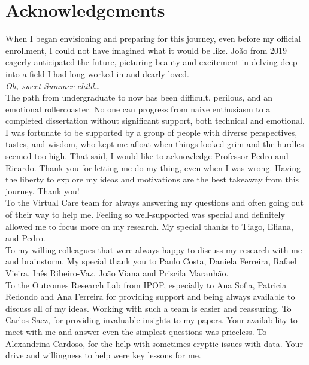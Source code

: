 \chapter*{Acknowledgements}

When I began envisioning and preparing for this journey, even before my official enrollment, I could not have imagined what it would be like. João from 2019 eagerly anticipated the future, picturing beauty and excitement in delving deep into a field I had long worked in and dearly loved. \\
 \textit{Oh, sweet Summer child…} \\

The path from undergraduate to now has been difficult, perilous, and an emotional rollercoaster. No one can progress from naive enthusiasm to a completed dissertation without significant support, both technical and emotional. I was fortunate to be supported by a group of people with diverse perspectives, tastes, and wisdom, who kept me afloat when things looked grim and the hurdles seemed too high. 
That said, I would like to acknowledge Professor Pedro and Ricardo.  Thank you for letting me do my thing, even when I was wrong. Having the liberty to explore my ideas and motivations are the best takeaway from this journey. Thank you! \\

To the Virtual Care team for always answering my questions and often going out of their way to help me. Feeling so well-supported was special and definitely allowed me to focus more on my research. My special thanks to Tiago, Eliana, and Pedro. \\

To my willing colleagues that were always happy to discuss my research with me and brainstorm. My special thank you to Paulo Costa, Daniela Ferreira, Rafael Vieira, Inês Ribeiro-Vaz, João Viana and Priscila Maranhão. \\

To the Outcomes Research Lab from IPOP, especially to Ana Sofia, Patricia Redondo and Ana Ferreira for providing support and being always available to discuss all of my ideas. Working with such a team is easier and reassuring. To Carlos Saez, for providing invaluable insights to my papers. Your availability to meet with me and answer even the simplest questions was priceless. To Alexandrina Cardoso, for the help with sometimes cryptic issues with data. Your drive and willingness to help were key lessons for me. \\

